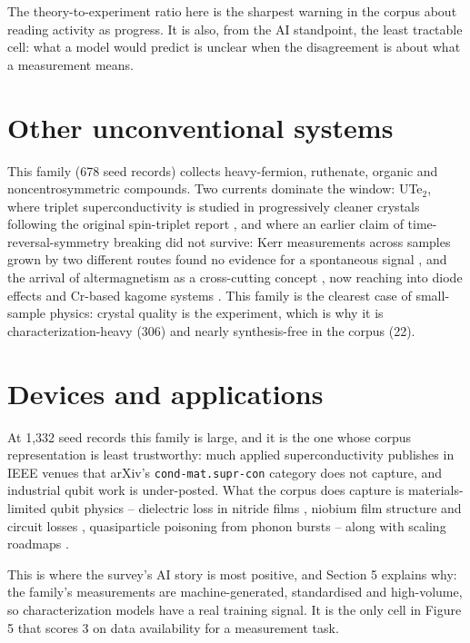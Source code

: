 \documentclass[
  11pt,
]{article}
\begin{document}
The theory-to-experiment ratio here is the sharpest warning in the
corpus about reading activity as progress. It is also, from the AI
standpoint, the least tractable cell: what a model would predict is
unclear when the disagreement is about what a measurement means.

\section{Other unconventional
systems}\label{other-unconventional-systems}

This family (678 seed records) collects heavy-fermion, ruthenate,
organic and noncentrosymmetric compounds. Two currents dominate the
window: UTe\(_2\), where triplet superconductivity is studied in
progressively cleaner crystals \citep{wu2023enhanced} following the
original spin-triplet report \citep{ran2019nearly}, and where an earlier
claim of time-reversal-symmetry breaking did not survive: Kerr
measurements across samples grown by two different routes found no
evidence for a spontaneous signal \citep{ajeesh2023fate}, and the
arrival of altermagnetism as a cross-cutting concept
\citep{mazin2022notes}, now reaching into diode effects
\citep{schrade2026altermagnetic} and Cr-based kagome systems
\citep{xu2023altermagnetic, peng2024flat}. This family is the clearest
case of small-sample physics: crystal quality is the experiment, which
is why it is characterization-heavy (306) and nearly synthesis-free in
the corpus (22).

\section{Devices and applications}\label{devices-and-applications}

At 1,332 seed records this family is large, and it is the one whose
corpus representation is least trustworthy: much applied
superconductivity publishes in IEEE venues that arXiv's
\texttt{cond-mat.supr-con} category does not capture, and industrial
qubit work is under-posted. What the corpus does capture is
materials-limited qubit physics -- dielectric loss in nitride films
\citep{deng2022titanium}, niobium film structure and circuit losses
\citep{drimmer2024effect}, quasiparticle poisoning from phonon bursts
\citep{anthonypetersen2022stress} -- along with scaling roadmaps
\citep{mohseni2024build, aasen2025roadmap}.

This is where the survey's AI story is most positive, and Section 5
explains why: the family's measurements are machine-generated,
standardised and high-volume, so characterization models have a real
training signal. It is the only cell in Figure 5 that scores 3 on data
availability for a measurement task.
\end{document}
